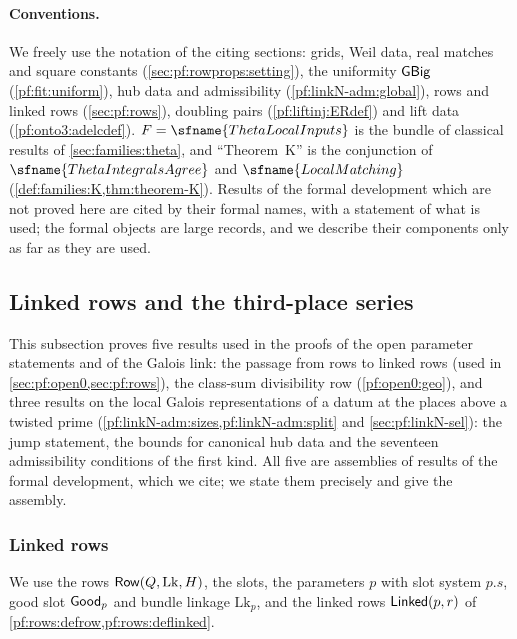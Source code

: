 \paragraph{Conventions.}
We freely use the notation of the citing sections: grids, Weil data, real matches and square constants
(\cref{sec:pf:rowprops:setting}), the uniformity $\mathsf{GBig}$ (\cref{pf:fit:uniform}), hub data and admissibility
(\cref{pf:linkN-adm:global}), rows and linked rows (\cref{sec:pf:rows}), doubling pairs (\cref{pf:liftinj:ERdef}) and lift data
(\cref{pf:onto3:adelcdef}). $F=\sfname{ThetaLocalInputs}$ is the bundle of classical results of \cref{sec:families:theta}, and
``Theorem~K'' is the conjunction of $\sfname{ThetaIntegralsAgree}$ and $\sfname{LocalMatching}$ (\cref{def:families:K,thm:theorem-K}).
Results of the formal development which are not proved here are cited by their formal names, with a statement of what is used;
the formal objects are large records, and we describe their components only as far as they are used.

\subsection{Linked rows and the third-place series}\label{sec:pf:sh-theta:rows}

This subsection proves five results used in the proofs of the open parameter statements and of the Galois link: the
passage from rows to linked rows (used in \cref{sec:pf:open0,sec:pf:rows}), the class-sum divisibility row
(\cref{pf:open0:geo}), and three results on the local Galois representations of a datum at the places above a twisted
prime (\cref{pf:linkN-adm:sizes,pf:linkN-adm:split} and \cref{sec:pf:linkN-sel}): the jump statement, the bounds for
canonical hub data and the seventeen admissibility conditions of the first kind. All five are assemblies of results of the
formal development, which we cite; we state them precisely and give the assembly.

\subsubsection{Linked rows}

We use the rows $\mathsf{Row}(Q,\mathrm{Lk},H)$, the slots, the parameters $p$ with slot system $p.s$, good slot
$\mathsf{Good}_p$ and bundle linkage $\mathrm{Lk}_p$, and the linked rows $\mathsf{Linked}(p,r)$ of
\cref{pf:rows:defrow,pf:rows:deflinked}.

